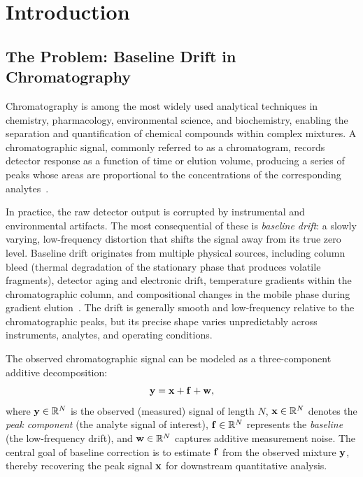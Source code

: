 \chapter{Introduction}
\label{chap:introduction}

\section{The Problem: Baseline Drift in Chromatography}
\label{sec:intro_problem}

Chromatography is among the most widely used analytical techniques in chemistry, pharmacology, environmental science, and biochemistry, enabling the separation and quantification of chemical compounds within complex mixtures. A chromatographic signal, commonly referred to as a chromatogram, records detector response as a function of time or elution volume, producing a series of peaks whose areas are proportional to the concentrations of the corresponding analytes~\cite{skoog2017fundamentals}.

In practice, the raw detector output is corrupted by instrumental and environmental artifacts. The most consequential of these is \emph{baseline drift}: a slowly varying, low-frequency distortion that shifts the signal away from its true zero level. Baseline drift originates from multiple physical sources, including column bleed (thermal degradation of the stationary phase that produces volatile fragments), detector aging and electronic drift, temperature gradients within the chromatographic column, and compositional changes in the mobile phase during gradient elution~\cite{ning2014beads}. The drift is generally smooth and low-frequency relative to the chromatographic peaks, but its precise shape varies unpredictably across instruments, analytes, and operating conditions.

The observed chromatographic signal can be modeled as a three-component additive decomposition:
\begin{equation}
    \mathbf{y} = \mathbf{x} + \mathbf{f} + \mathbf{w},
    \label{eq:signal_model}
\end{equation}
where $\mathbf{y} \in {\mathbb R}^N$ is the observed (measured) signal of length $N$, $\mathbf{x} \in {\mathbb R}^N$ denotes the \emph{peak component} (the analyte signal of interest), $\mathbf{f} \in {\mathbb R}^N$ represents the \emph{baseline} (the low-frequency drift), and $\mathbf{w} \in {\mathbb R}^N$ captures additive measurement noise. The central goal of baseline correction is to estimate $\mathbf{f}$ from the observed mixture $\mathbf{y}$, thereby recovering the peak signal $\mathbf{x}$ for downstream quantitative analysis.


